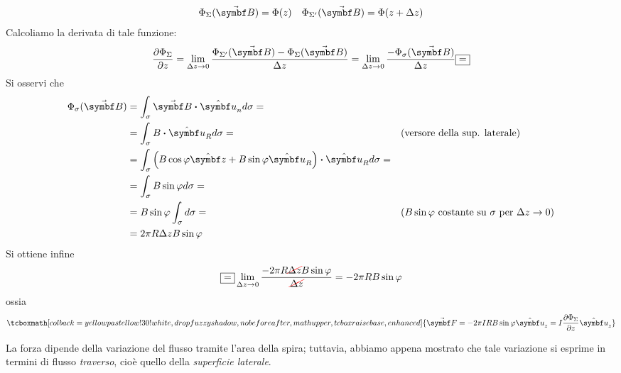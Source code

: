 \begin{align*}
	\Phi_{\Sigma}(\vba{B})=\Phi(z)&&\Phi_{\Sigma'}(\vba{B})=\Phi(z+\Delta z)
\end{align*}
Calcoliamo la derivata di tale funzione:
\begin{equation*}
	\pdv{\Phi_{\Sigma}}{z}=\lim_{\Delta z\to 0}\frac{\Phi_{\Sigma'}(\vba{B})-\Phi_{\Sigma}(\vba{B})}{\Delta z}=\lim_{\Delta z\to 0}\frac{-\Phi_{\sigma}(\vba{B})}{\Delta z}\squarequal
\end{equation*}
Si osservi che
\begin{align*}
	\Phi_{\sigma}(\vba{B})&=\int_{\sigma}\vba{B}\vdot\vbh{u}_nd\sigma=&&\\
	&=\int_{\sigma}B\vdot\vbh{u}_Rd\sigma=&&\text{(versore della sup. laterale)}\\
	&=\int_{\sigma}\left(B\cos\phi\vbh{z}+B\sin\phi\vbh{u}_R\right)\vdot\vbh{u}_Rd\sigma=&&\\
	&=\int_{\sigma}B\sin\phi d\sigma=&&\\
	&=B\sin\phi\int_{\sigma}d\sigma=&&\text{(}B\sin\phi\ \text{costante su}\ \sigma\ \text{per}\ \Delta z\to 0\text{)}\\
	&=2\pi R \Delta z B\sin\phi&&
\end{align*}
Si ottiene infine
\begin{equation*}
	\squarequal\lim_{\Delta z\to 0}\frac{-2\pi R \Ccancel[red]{\Delta z} B\sin\phi}{\Ccancel[red]{\Delta z}}=-2\pi R B\sin\phi
\end{equation*}
ossia
\begin{equation}
		\tcboxmath[colback=yellowpastellow!30!white,drop fuzzy shadow, nobeforeafter, math upper, tcbox raise base, enhanced]{\vba{F}=-2\pi IRB\sin\phi\vbh{u}_z=I\pdv{\Phi_{\Sigma}}{z}\vbh{u}_z}
\end{equation}
\begin{observe}
	La forza dipende della variazione del flusso tramite l'area della spira; tuttavia, abbiamo appena mostrato che tale variazione si esprime in termini di flusso \textit{traverso}, cioè quello della \textit{superficie laterale}.
\end{observe}
